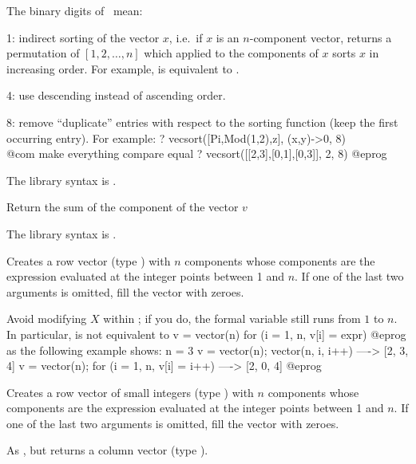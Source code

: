 \noindent The binary digits of \fl\ mean:

\item 1: indirect sorting of the vector $x$, i.e.~if $x$ is an
$n$-component vector, returns a permutation of $[1,2,\dots,n]$ which
applied to the components of $x$ sorts $x$ in increasing order.
For example,  is equivalent to
.

\item 4: use descending instead of ascending order.

\item 8: remove ``duplicate'' entries with respect to the sorting function
(keep the first occurring entry).  For example:
\bprog
  ? vecsort([Pi,Mod(1,2),z], (x,y)->0, 8)   \\@com make everything compare equal
  ? vecsort([[2,3],[0,1],[0,3]], 2, 8)
@eprog

The library syntax is .

\label{se:vecsum}
Return the sum of the component of the vector $v$

The library syntax is .

\label{se:vector}
Creates a row vector (type
) with $n$ components whose components are the expression
 evaluated at the integer points between 1 and $n$. If one of the
last two arguments is omitted, fill the vector with zeroes.

Avoid modifying $X$ within ; if you do, the formal variable
still runs from $1$ to $n$. In particular,  is not
equivalent to
\bprog
v = vector(n)
for (i = 1, n, v[i] = expr)
@eprog\noindent
as the following example shows:
\bprog
n = 3
v = vector(n); vector(n, i, i++)            ----> [2, 3, 4]
v = vector(n); for (i = 1, n, v[i] = i++)   ----> [2, 0, 4]
@eprog\noindent

\label{se:vectorsmall}
Creates a row vector of small integers (type
) with $n$ components whose components are the expression
 evaluated at the integer points between 1 and $n$. If one of the
last two arguments is omitted, fill the vector with zeroes.

\label{se:vectorv}
As , but returns a column vector (type ).

